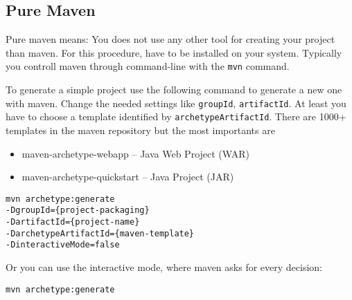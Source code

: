 \subsection{Pure Maven}

Pure maven means: You does not use any other tool for creating your project than maven. For this procedure,  have to be installed on your system. Typically you controll maven through command-line with the \lstinline{mvn} command.

To generate a simple project use the following command to generate a new one with maven. Change the needed settings like \lstinline{groupId}, \lstinline{artifactId}.\label{maven:archtype} At least you have to choose a template identified by \lstinline{archetypeArtifactId}. There are 1000+ templates in the maven repository but the most importants are 
\begin{itemize}
	\item maven-archetype-webapp – Java Web Project (WAR)
	\item maven-archetype-quickstart – Java Project (JAR)
\end{itemize}

\begin{lstlisting}
mvn archetype:generate 
-DgroupId={project-packaging}
-DartifactId={project-name}
-DarchetypeArtifactId={maven-template} 
-DinteractiveMode=false

\end{lstlisting}

Or you can use the interactive mode, where maven asks for every decision:

\begin{lstlisting}
mvn archetype:generate 
\end{lstlisting}

